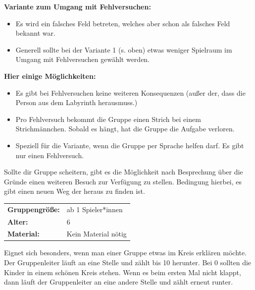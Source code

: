\textbf{Variante zum Umgang mit Fehlversuchen:}
\begin{itemize}
    \item Es wird ein falsches Feld betreten, welches aber schon als falsches Feld bekannt war.
    \item Generell sollte bei der Variante 1 (s. oben) etwas weniger Spielraum im Umgang mit Fehlversuchen gewählt werden.

\end{itemize}

\textbf{Hier einige Möglichkeiten:}
\begin{itemize}
    \item Es gibt bei Fehlversuchen keine weiteren Konsequenzen (außer der, dass die Person aus dem Labyrinth herausmuss.)
    \item  Pro Fehlversuch bekommt die Gruppe einen Strich bei einem Strichmännchen. Sobald es hängt, hat die Gruppe die Aufgabe verloren.
    \item Speziell für die Variante, wenn die Gruppe per Sprache helfen darf. Es gibt nur einen Fehlversuch.
\end{itemize}
Sollte dir Gruppe scheitern, gibt es die Möglichkeit nach Besprechung über die Gründe einen weiteren Besuch zur Verfügung zu stellen. Bedingung hierbei, es gibt einen neuen Weg der heraus zu finden ist.


\begin{table}[H]
\begin{tabular}{>{\bfseries}lp{8cm}}
   Gruppengröße:   & ab 1 Spieler*innen\\
    Alter: & 6 \\
    Material: & Kein Material nötig \\ 
\end{tabular}
\end{table} 

Eignet sich besonders, wenn man einer Gruppe etwas im Kreis erklären möchte. Der Gruppenleiter läuft an eine Stelle und zählt bis 10 herunter. Bei 0 sollten die Kinder in einem schönen Kreis stehen. Wenn es beim ersten Mal nicht klappt, dann läuft der Gruppenleiter an eine andere Stelle und zählt erneut runter.

